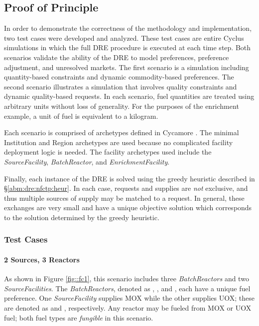 \subsection{Proof of Principle}\label{abm:dre:proof}

In order to demonstrate the correctness of the methodology and implementation,
two test cases were developed and analyzed. These test cases are entire Cyclus
simulations in which the full DRE procedure is executed at each time step. Both
scenarios validate the ability of the DRE to model preferences, preference
adjustment, and unresolved markets. The first scenario is a simulation including
quantity-based constraints and dynamic commodity-based preferences. The second
scenario illustrates a simulation that involves quality constraints and dynamic
quality-based requests. In each scenario, fuel quantities are treated using
arbitrary units without loss of generality. For the purposes of the enrichment
example, a unit of fuel is equivalent to a kilogram.

Each scenario is comprised of archetypes defined in Cycamore
\cite{cycamore2013}. The minimal Institution and Region archetypes are used
because no complicated facility deployment logic is needed. The facility
archetypes used include the \textit{SourceFacility}, \textit{BatchReactor}, and
\textit{EnrichmentFacility}.

Finally, each instance of the DRE is solved using the greedy heuristic described
in \S \ref{abm:dre:nfctp:heur}. In each case, requests and supplies are
\textit{not} exclusive, and thus multiple sources of supply may be matched to a
request. In general, these exchanges are very small and have a unique objective
solution which corresponds to the solution determined by the greedy heuristic.

\subsubsection{Test Cases}\label{abm:dre:proof:cases}

\paragraph{2 Sources, 3 Reactors}

As shown in Figure \ref{fig::fc1}, this scenario includes three
\textit{BatchReactors} and two \textit{SourceFacilities}. The
\textit{BatchReactors}, denoted as , , and ,
each have a unique fuel preference. One \textit{SourceFacility} supplies MOX
while the other supplies UOX; these are denoted as \MOXSource{} and
\UOXSource{}, respectively. Any reactor may be fueled from MOX or UOX fuel; both
fuel types are \textit{fungible} in this scenario.

